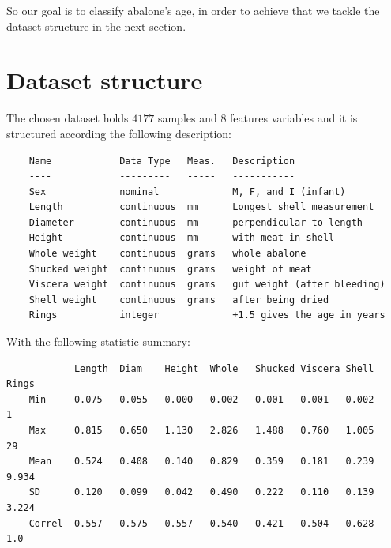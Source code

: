 \documentclass[10pt,a4paper]{article}
\begin{document}
    So our goal is to classify abalone's age, in order to achieve that
    we tackle the dataset structure in the next section.

    \newpage

    \section{Dataset structure}

    The chosen dataset holds $4177$ samples and $8$ features variables and it 
    is structured according the following description:

    \begin{verbatim}
    Name            Data Type   Meas.   Description
    ----            ---------   -----   -----------
    Sex             nominal             M, F, and I (infant)
    Length          continuous  mm      Longest shell measurement
    Diameter        continuous  mm      perpendicular to length
    Height          continuous  mm      with meat in shell
    Whole weight    continuous  grams   whole abalone
    Shucked weight  continuous  grams   weight of meat
    Viscera weight  continuous  grams   gut weight (after bleeding)
    Shell weight    continuous  grams   after being dried
    Rings           integer             +1.5 gives the age in years
    \end{verbatim}

    With the following statistic summary:

    \begin{verbatim}
            Length  Diam    Height  Whole   Shucked Viscera Shell   Rings
    Min     0.075   0.055   0.000   0.002   0.001   0.001   0.002       1
    Max     0.815   0.650   1.130   2.826   1.488   0.760   1.005      29
    Mean    0.524   0.408   0.140   0.829   0.359   0.181   0.239   9.934
    SD      0.120   0.099   0.042   0.490   0.222   0.110   0.139   3.224
    Correl  0.557   0.575   0.557   0.540   0.421   0.504   0.628     1.0
    \end{verbatim}
\end{document}
